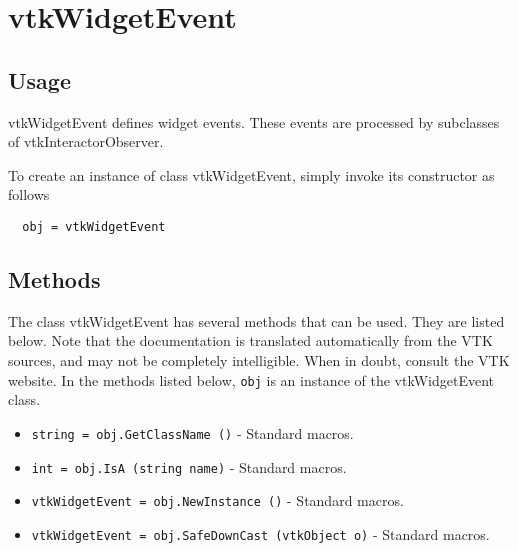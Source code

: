 \section{vtkWidgetEvent}

\subsection{Usage}

 vtkWidgetEvent defines widget events. These events are processed by
 subclasses of vtkInteractorObserver.

To create an instance of class vtkWidgetEvent, simply
invoke its constructor as follows
\begin{verbatim}
  obj = vtkWidgetEvent
\end{verbatim}
\subsection{Methods}

The class vtkWidgetEvent has several methods that can be used.
  They are listed below.
Note that the documentation is translated automatically from the VTK sources,
and may not be completely intelligible.  When in doubt, consult the VTK website.
In the methods listed below, \verb|obj| is an instance of the vtkWidgetEvent class.
\begin{itemize}
\item  \verb|string = obj.GetClassName ()| -  Standard macros.

\item  \verb|int = obj.IsA (string name)| -  Standard macros.

\item  \verb|vtkWidgetEvent = obj.NewInstance ()| -  Standard macros.

\item  \verb|vtkWidgetEvent = obj.SafeDownCast (vtkObject o)| -  Standard macros.

\end{itemize}

